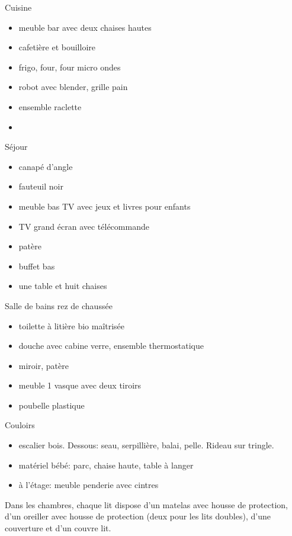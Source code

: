 \documentclass[a4paper,11pt]{article}
\begin{document}
\vspace{0.25cm}

Cuisine
\begin{itemize}
\item meuble bar avec deux chaises hautes 
\item cafetière et bouilloire
\item frigo, four, four micro ondes
\item robot avec blender, grille pain
\item ensemble raclette
\item 
\end{itemize}

\vspace{0.25cm}

Séjour
\begin{itemize}
\item canapé d'angle
\item fauteuil noir
\item meuble bas TV avec jeux et livres pour enfants
\item TV grand écran avec télécommande
\item patère
\item buffet bas 
\item une table et huit chaises
\end{itemize}

\vspace{0.25cm}

Salle de bains rez de chaussée
\begin{itemize}
\item toilette à litière bio maîtrisée
\item douche avec cabine verre, ensemble thermostatique
\item miroir, patère
\item meuble 1 vasque avec deux tiroirs
\item poubelle plastique
\end{itemize}

\vspace{0.25cm}
Couloirs
\begin{itemize}
\item escalier bois. Dessous: seau, serpillière, balai, pelle. Rideau sur tringle.
\item matériel bébé: parc, chaise haute, table à langer
\item à l'étage: meuble penderie avec cintres
\end{itemize}

Dans les chambres, chaque lit dispose d'un matelas avec housse de protection, d'un oreiller avec housse de protection (deux pour les lits doubles),  d'une couverture et d'un couvre lit.
\end{document}
